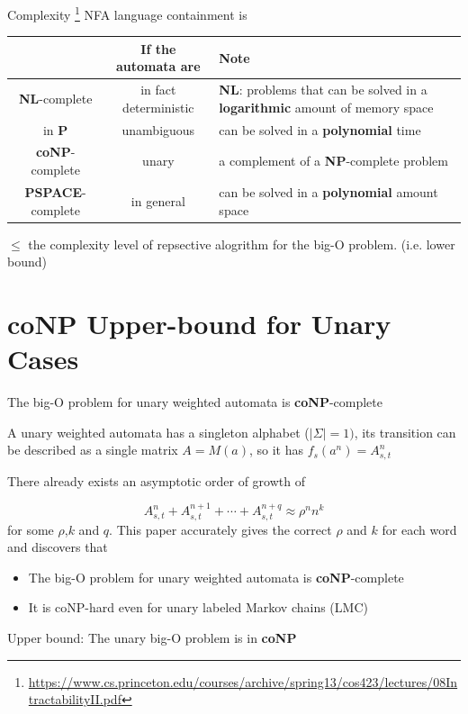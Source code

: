 \documentclass[aspectratio=169]{beamer}
\begin{document}
\begin{frame}{Complexity \footnote{\url{https://www.cs.princeton.edu/courses/archive/spring13/cos423/lectures/08IntractabilityII.pdf}}}
 NFA language containment is
 \begin{table}
 \begin{tabular}{c|c|p{}}
     \toprule
     & If the automata are & Note \\
     \midrule
     \textbf{NL}-complete  & in fact deterministic & \textbf{NL}: problems that can be solved in a \textbf{logarithmic} amount of memory space \\
     \hline
     in \textbf{P} & unambiguous & can be solved in a \textbf{polynomial} time \\
     \hline
     \textbf{coNP}-complete & unary &  a complement of a \textbf{NP}-complete problem \\
     \hline
     \textbf{PSPACE}-complete & in general & can be solved in a \textbf{polynomial} amount space \\
     \bottomrule
 \end{tabular}
\end{table}
 
 $\le$ the complexity level of repsective alogrithm for the big-O problem. (i.e. lower bound)

\end{frame}

\section{coNP Upper-bound for Unary Cases}

\begin{frame}{The big-O problem for unary weighted automata is \textbf{coNP}-complete}
    \begin{definition}
        A unary weighted automata has a singleton alphabet ($|\Sigma| = 1)$, its transition can be described as a single matrix $A=M(a)$, so it has $f_s(a^n) = A_{s,t}^n$
    \end{definition}

    There already exists an asymptotic order
    of growth of

    $$A_{s,t}^n + A_{s,t}^{n+1} + \cdots + A_{s,t}^{n+q} \approx \rho ^n n^k$$ for some $\rho$,$k$ and $q$. This paper accurately gives the correct $\rho$ and $k$ for each word and discovers that

    \begin{itemize}
        \item The big-O problem for unary weighted automata is \textbf{coNP}-complete
        \item It is
        coNP-hard even for unary labeled Markov chains (LMC)
    \end{itemize}

    \begin{block}{}
        \large{Upper bound: The unary big-O problem is in \textbf{coNP}}
    \end{block}
\end{frame}
\end{document}
